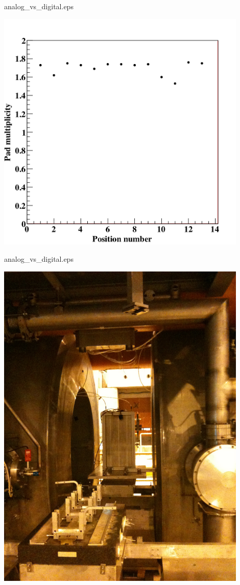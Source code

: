 \begin{frame}{analog\_vs\_digital.eps}
  \centerline{\includegraphics[width=0.9\textwidth]{images/Test1m2Multiplicity}}
\end{frame}
\begin{frame}{analog\_vs\_digital.eps}
  \centerline{\includegraphics[width=0.9\textwidth]{images/PowerPulsingPhoto}}
\end{frame}
